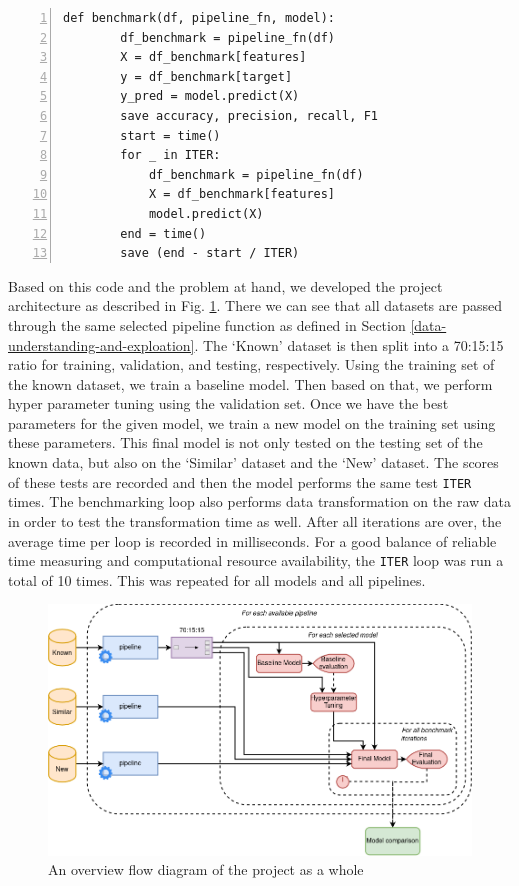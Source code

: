 \documentclass[journal]{IEEEtran}
\begin{document}
\begin{lstlisting}[numbers=left,numbersep=-2em,frame=lines]
    def benchmark(df, pipeline_fn, model):
        df_benchmark = pipeline_fn(df)
        X = df_benchmark[features]
        y = df_benchmark[target]
        y_pred = model.predict(X)
        save accuracy, precision, recall, F1
        start = time()
        for _ in ITER:
            df_benchmark = pipeline_fn(df)
            X = df_benchmark[features]
            model.predict(X)
        end = time()
        save (end - start / ITER)
\end{lstlisting}

Based on this code and the problem at hand, we developed the project architecture as described in Fig. \ref{fig:project-arch}. There we can see that all datasets are passed through the same selected pipeline function as defined in Section \ref{data-understanding-and-exploation}. The `Known' dataset is then split into a 70:15:15 ratio for training, validation, and testing, respectively. Using the training set of the known dataset, we train a baseline model. Then based on that, we perform hyper parameter tuning using the validation set. Once we have the best parameters for the given model, we train a new model on the training set using these parameters. This final model is not only tested on the testing set of the known data, but also on the `Similar' dataset and the `New' dataset. The scores of these tests are recorded and then the model performs the same test \lstinline{ITER} times. The benchmarking loop also performs data transformation on the raw data in order to test the transformation time as well. After all iterations are over, the average time per loop is recorded in milliseconds. For a good balance of reliable time measuring and computational resource availability, the \lstinline{ITER} loop was run a total of 10 times. This was repeated for all models and all pipelines.

\begin{figure}
    \centering
    \includegraphics[width=\linewidth]{figures/uploads/project_arch.png}
    \caption{An overview flow diagram of the project as a whole}
    \label{fig:project-arch}
\end{figure}
\end{document}
